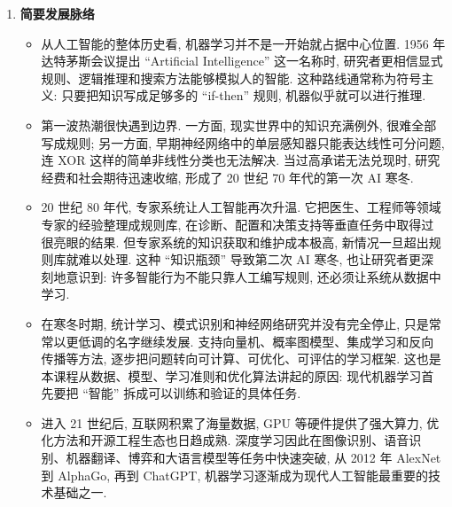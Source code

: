 \documentclass{../nndlcourse}
\begin{document}
\begin{enumerate}
\begin{itemize}
\begin{itemize}
          \item 回归任务: 预测连续型输出, 例如房价估计、销量预测和温度预测.
          \item 分类任务: 预测离散类别标签, 例如手写数字识别、邮件分类和疾病辅助诊断.
        \end{itemize}
      \item 无监督学习: 在无标签数据上发现潜在结构、表示或分布特征.
        \begin{itemize}
          \item 聚类: 按相似性将样本划分为若干组, 例如客户分群和图像分割.
          \item 降维: 将高维数据映射到低维表示, 便于可视化、压缩与后续建模, 例如主成分分析.
        \end{itemize}
      \item 强化学习: 智能体通过与环境交互获得反馈, 学习能够最大化长期累计回报的策略.
    \end{itemize}
  \item \textbf{简要发展脉络}
    \begin{itemize}
      \item 从人工智能的整体历史看, 机器学习并不是一开始就占据中心位置. 1956 年达特茅斯会议提出 ``Artificial Intelligence'' 这一名称时, 研究者更相信显式规则、逻辑推理和搜索方法能够模拟人的智能. 这种路线通常称为符号主义: 只要把知识写成足够多的 ``if-then'' 规则, 机器似乎就可以进行推理.
      \item 第一波热潮很快遇到边界. 一方面, 现实世界中的知识充满例外, 很难全部写成规则; 另一方面, 早期神经网络中的单层感知器只能表达线性可分问题, 连 XOR 这样的简单非线性分类也无法解决. 当过高承诺无法兑现时, 研究经费和社会期待迅速收缩, 形成了 20 世纪 70 年代的第一次 AI 寒冬.
      \item 20 世纪 80 年代, 专家系统让人工智能再次升温. 它把医生、工程师等领域专家的经验整理成规则库, 在诊断、配置和决策支持等垂直任务中取得过很亮眼的结果. 但专家系统的知识获取和维护成本极高, 新情况一旦超出规则库就难以处理. 这种 ``知识瓶颈'' 导致第二次 AI 寒冬, 也让研究者更深刻地意识到: 许多智能行为不能只靠人工编写规则, 还必须让系统从数据中学习.
      \item 在寒冬时期, 统计学习、模式识别和神经网络研究并没有完全停止, 只是常常以更低调的名字继续发展. 支持向量机、概率图模型、集成学习和反向传播等方法, 逐步把问题转向可计算、可优化、可评估的学习框架. 这也是本课程从数据、模型、学习准则和优化算法讲起的原因: 现代机器学习首先要把 ``智能'' 拆成可以训练和验证的具体任务.
      \item 进入 21 世纪后, 互联网积累了海量数据, GPU 等硬件提供了强大算力, 优化方法和开源工程生态也日趋成熟. 深度学习因此在图像识别、语音识别、机器翻译、博弈和大语言模型等任务中快速突破, 从 2012 年 AlexNet 到 AlphaGo, 再到 ChatGPT, 机器学习逐渐成为现代人工智能最重要的技术基础之一.

\end{itemize}
\end{enumerate}
\end{document}
